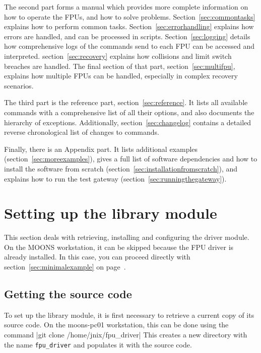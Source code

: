 \documentclass[11pt,a4paper]{scrartcl}
\begin{document}
The second part forms a manual which provides more complete
information on how to operate the FPUs, and how to solve
problems. Section~\ref{sec:commontasks} explains how to perform common
tasks. Section~\ref{sec:errorhandling} explains how errors are
handled, and can be processed in scripts. Section~\ref{sec:logging}
details how comprehensive logs of the commands send to each FPU can be
accessed and interpreted. section~\ref{sec:recovery} explains how
collisions and limit switch breaches are handled. The final section
of that part, section~\ref{sec:multifpu}, explains how multiple FPUs
can be handled, especially in complex recovery scenarios.

The third part is the reference part, section~\ref{sec:reference}.
It lists all available commands with a comprehensive list of all their
options, and also documents the hierarchy of exceptions.
Additionally, section~\ref{sec:changelog} contains a detailed reverse
chronological list of changes to commands.

Finally, there is an Appendix part. It lists additional examples
(section~\ref{sec:moreexamples}), gives a full list of software
dependencies and how to install the software from scratch
(section~\ref{sec:installationfromscratch}), and explains how to run
the test gateway (section~\ref{sec:runningthegateway}).

\section{Setting up the library module}
\label{sec:settingup}

This section deals with retrieving, installing and configuring the
driver module. On the MOONS workstation, it can be skipped because the
FPU driver is already installed.  In this case, you can proceed
directly with section~\ref{sec:minimalexample} on
page~\pageref{sec:minimalexample}.

\subsection{Getting the source code}

To set up the library module, it is first
necessary to retrieve a current copy of its source code.
On the moons-pc01 workstation, this can be done using the
command |git clone /home/jnix/fpu_driver|
This creates a new directory with the name \texttt{fpu\_driver}
and populates it with the source code.
\end{document}
